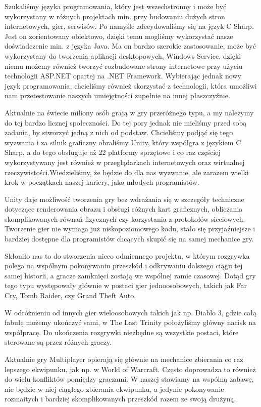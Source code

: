 \documentclass[openright]{xmgr}
\begin{document}
  Szukaliśmy języka programowania, który jest wszechstronny i może być wykorzystany w różnych projektach min. przy budowaniu dużych stron internetowych, gier, serwisów. Po namyśle zdecydowaliśmy się na język C Sharp. Jest on zorientowany obiektowo, dzięki temu mogliśmy wykorzystać nasze doświadczenie min. z języka Java.  Ma on bardzo szerokie zastosowanie, może być wykorzystany do tworzenia aplikacji desktopowych, Windows Service, dzięki niemu możemy również tworzyć rozbudowane strony internetowe przy użyciu technologii ASP.NET opartej na .NET Framework. Wybierając jednak nowy język programowania, chcieliśmy również skorzystać z technologii, która umożliwi nam przetestowanie naszych umiejętności zupełnie na innej płaszczyźnie.

  Aktualnie na świecie miliony osób grają w gry przeróżnego typu, a my należymy do tej bardzo licznej społeczności. Do tej pory jednak nie mieliśmy przed sobą zadania, by stworzyć jedną z nich od podstaw. Chcieliśmy podjąć się tego wyzwania i za silnik graficzny obraliśmy Unity, który współgra z językiem C Sharp, a do tego obsługuje aż 22 platformy sprzętowe i co raz częściej wykorzystywany jest również w przeglądarkach internetowych oraz wirtualnej rzeczywistości.Wiedzieliśmy, że będzie do dla nas wyzwanie, ale zarazem wielki krok w początkach naszej kariery, jako młodych programistów.

  Unity daje możliwość tworzenia gry bez wdrażania się w szczegóły techniczne dotyczące renderowania obrazu i obsługi różnych kart graficznych, obliczania skomplikowanych równań fizycznych czy korzystania z protokołów sieciowych. Tworzenie gier nie wymaga już niskopoziomowego kodu, stało się przyjaźniejsze i bardziej dostępne dla programistów chcących skupić się na samej mechanice gry.

  Skłoniło nas to do stworzenia nieco odmiennego projektu, w którym rozgrywka polega na wspólnym pokonywaniu przeszkód i odkrywaniu dalszego ciągu tej samej historii, a gracze zamknięci zostają we wspólnej ramie czasowej. Dotąd gry tego typu występowały głównie w postaci gier jednoosobowych, takich jak Far Cry, Tomb Raider, czy Grand Theft Auto.

  W odróżnieniu od innych gier wieloosobowych takich jak np. Diablo 3, gdzie całą fabułę możemy ukończyć sami, w The Last Trinity położyliśmy główny nacisk na współpracę. Do ukończenia rozgrywki niezbędne są wszystkie postaci, które sterowane są przez różnych graczy.

  Aktualnie gry Multiplayer opierają się głównie na mechanice zbierania co raz lepszego ekwipunku, jak np. w World of Warcraft. Często doprowadza to również do wielu konfliktów pomiędzy graczami. W naszej stawiamy na wspólną zabawę, nie będzie w niej ciągłego zbierania ekwipunku, a jedynie pokonywanie rozmaitych i bardziej skomplikowanych przeszkód razem ze swoją drużyną.
\end{document}

